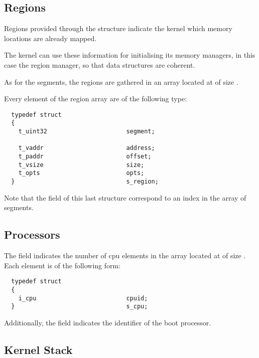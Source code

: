 
\subsection*{Regions}

Regions provided through the  structure indicate the kernel
which memory locations are already mapped.

The kernel can use these information for initialising its memory managers,
in this case the region manager, so that data structures are coherent.

As for the segments, the  regions are gathered in an
array located at  of size .

Every element of the region array are of the following type:

\begin{verbatim}
  typedef struct
  {
    t_uint32                      segment;

    t_vaddr                       address;
    t_paddr                       offset;
    t_vsize                       size;
    t_opts                        opts;
  }                               s_region;
\end{verbatim}

Note that the  field of this last structure correspond to
an index in the array of segments.


\subsection*{Processors}

The  field indicates the number of cpu elements in the array
located at  of size . Each element is of the
following form:

\begin{verbatim}
  typedef struct
  {
    i_cpu                         cpuid;
  }                               s_cpu;
\end{verbatim}

Additionally, the  field indicates the identifier of the boot
processor.


\subsection*{Kernel Stack}

